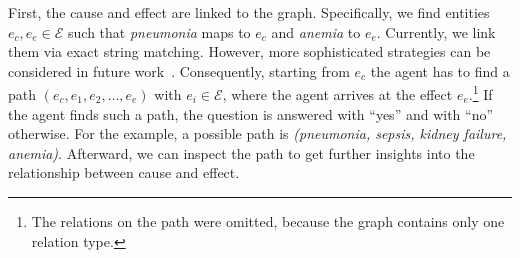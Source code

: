 First, the cause and effect are linked to the graph. Specifically, we find entities $e_c, e_e \in \mathcal{E}$
such that \textit{pneumonia} maps to $e_c$ and \textit{anemia} to $e_e$. Currently, we 
link them via exact string matching. However, 
more sophisticated strategies can be considered in future work~\cite{Kaiser2021Reinforcement}.
Consequently, starting from $e_c$
the agent has to find a path $(e_c, e_1, e_2, \dots, e_e)$ with $e_i \in \mathcal{E}$, where the agent arrives at the effect $e_e$.\footnote{The relations on the path were omitted, because the graph contains only one relation type.} 
If the agent finds such a path, the question is answered with ``yes'' and with ``no'' otherwise.
For the example, a possible path is \textit{(pneumonia, sepsis, kidney  failure, anemia)}.
Afterward, we can
inspect the path to get further insights into the relationship between cause and effect.

